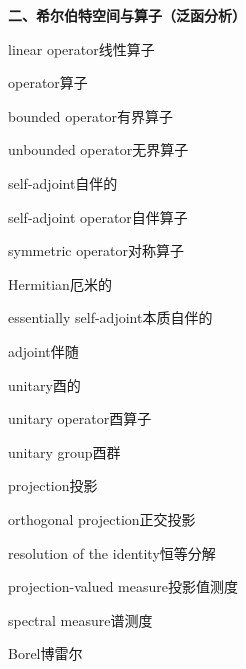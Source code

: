 \filbreak
\vspace{0.9em}
\noindent\textbf{二、希尔伯特空间与算子（泛函分析）}\par\nobreak\vspace{0.35em}
\begin{multicols}{2}
\raggedright
\setlength{\parindent}{0pt}
\setlength{\parskip}{0.16em}
\linespread{1.02}\selectfont
linear operator\hspace{0.9em}线性算子\par
operator\hspace{0.9em}算子\par
bounded operator\hspace{0.9em}有界算子\par
unbounded operator\hspace{0.9em}无界算子\par
self-adjoint\hspace{0.9em}自伴的\par
self-adjoint operator\hspace{0.9em}自伴算子\par
symmetric operator\hspace{0.9em}对称算子\par
Hermitian\hspace{0.9em}厄米的\par
essentially self-adjoint\hspace{0.9em}本质自伴的\par
adjoint\hspace{0.9em}伴随\par
unitary\hspace{0.9em}酉的\par
unitary operator\hspace{0.9em}酉算子\par
unitary group\hspace{0.9em}酉群\par
projection\hspace{0.9em}投影\par
orthogonal projection\hspace{0.9em}正交投影\par
resolution of the identity\hspace{0.9em}恒等分解\par
projection-valued measure\hspace{0.9em}投影值测度\par
spectral measure\hspace{0.9em}谱测度\par
Borel\hspace{0.9em}博雷尔\par

\end{multicols}
